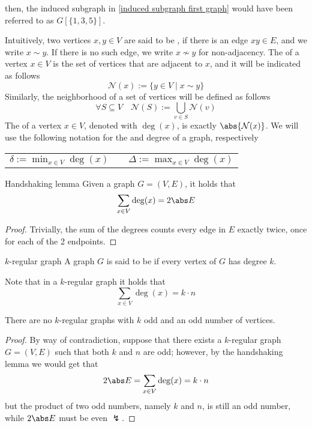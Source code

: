 \documentclass[a4paper, 12pt]{report}
\begin{document}
    then, the induced subgraph in \cref{induced subgraph first graph} would have been referred to as $G[\{1, 3, 5\}]$.

    Intuitively, two vertices $x, y \in V$ are said to be , if there is an edge $xy \in E$, and we write $x \sim y$. If there is no such edge, we write $x \nsim y$ for non-adjacency. The  of a vertex $x \in V$ is the set of vertices that are adjacent to $x$, and it will be indicated as follows $$\mathcal N (x) := \{y \in V \mid x \sim y\}$$ Similarly, the neighborhood of a set of vertices will be defined as follows $$\forall S \subseteq V \quad \mathcal N(S) := \bigcup_{v \in S}{\mathcal N (v)}$$ The  of a vertex $x \in V$, denoted with $\deg(x)$, is exactly $\abs{\mathcal N (x)}$. We will use the following notation for the  and  degree of a graph, respectively

    \begin{center}
        \begin{tabular}{ccc}
            $\displaystyle \delta := \min_{x \in V}{\deg(x)}$ & \qquad & $\displaystyle \Delta := \max_{x \in V}{\deg(x)}$
        \end{tabular}
    \end{center}

    \begin{framedlem}{Handshaking lemma}
        Given a graph $G = (V, E)$, it holds that $$\sum_{x \in V}{\deg(x)} = 2 \abs E$$
    \end{framedlem}

    \begin{proof}
        Trivially, the sum of the degrees counts every edge in $E$ exactly twice, once for each of the 2 endpoints.
    \end{proof}

    \begin{frameddefn}{$k$-regular graph}
        A graph $G$ is said to be  if every vertex of $G$ has degree $k$.
    \end{frameddefn}

    Note that in a $k$-regular graph it holds that $$\sum_{x \in V}{\deg(x)} = k \cdot n$$

    \begin{framedprop}{}
        There are no $k$-regular graphs with $k$ odd and an odd number of vertices.
    \end{framedprop}
    
    \begin{proof}
        By way of contradiction, suppose that there exists a $k$-regular graph $G = (V, E)$ such that both $k$ and $n$ are odd; however, by the handshaking lemma we would get that $$2 \abs E = \sum_{x \in V} {\deg(x)} = k \cdot n$$ but the product of two odd numbers, namely $k$ and $n$, is still an odd number, while $2 \abs E$ must be even $\lightning$.
    \end{proof}
\end{document}
